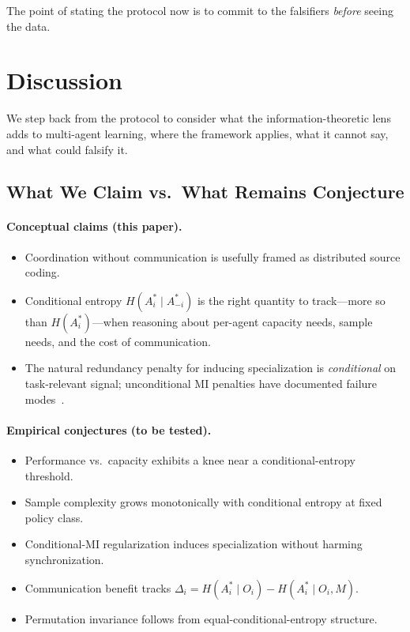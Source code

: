 \documentclass[10pt, letterpaper]{article}
\begin{document}
The point of stating the protocol now is to commit to the falsifiers \emph{before} seeing the data.

\section{Discussion}
\label{sec:discussion}

We step back from the protocol to consider what the information-theoretic lens adds to multi-agent learning, where the framework applies, what it cannot say, and what could falsify it.

\subsection{What We Claim vs.\ What Remains Conjecture}

\paragraph{Conceptual claims (this paper).}
\begin{itemize}
    \item Coordination without communication is usefully framed as distributed source coding.
    \item Conditional entropy $H(A_i^*\mid A_{-i}^*)$ is the right quantity to track---more so than $H(A_i^*)$---when reasoning about per-agent capacity needs, sample needs, and the cost of communication.
    \item The natural redundancy penalty for inducing specialization is \emph{conditional} on task-relevant signal; unconditional MI penalties have documented failure modes~\cite{li2022pmic}.
\end{itemize}

\paragraph{Empirical conjectures (to be tested).}
\begin{itemize}
    \item Performance vs.\ capacity exhibits a knee near a conditional-entropy threshold.
    \item Sample complexity grows monotonically with conditional entropy at fixed policy class.
    \item Conditional-MI regularization induces specialization without harming synchronization.
    \item Communication benefit tracks $\Delta_i = H(A_i^*\mid O_i) - H(A_i^*\mid O_i, M)$.
    \item Permutation invariance follows from equal-conditional-entropy structure.
\end{itemize}
\end{document}
